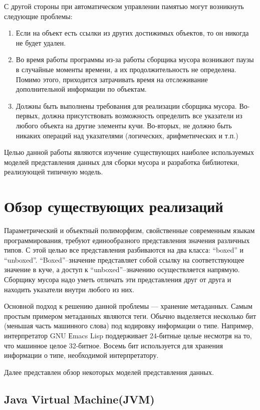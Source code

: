 С другой стороны при автоматическом управлении памятью могут возникнуть следующие проблемы:
\begin{enumerate}
\item Если на объект есть ссылки из других достижимых объектов, то он никогда не будет удален.
\item Во время работы программы из-за работы сборщика мусора возникают паузы в случайные моменты времени, а их продолжительность не определена.
Помимо этого, приходится затрачивать время на отслеживание дополнительной информации по объектам.
\item Должны быть выполнены  требования для реализации сборщика мусора.
Во-первых, должна присутствовать возможность определить все указатели из любого объекта на другие элементы кучи.
Во-вторых, не должно быть никаких операций над указателями (логических, арифметических и т.п.)
\end{enumerate}

Целью данной работы являются изучение существующих наиболее используемых моделей представления данных для сборки мусора и
разработка библиотеки, реализующей типичную модель.

\section{Обзор существующих реализаций}

Параметрический и объектный полиморфизм, свойственные современным языкам программирования, требуют единообразного представления  
значения различных типов. С этой целью все представления разбиваются на два класса: ``boxed'' и ``unboxed''. ``Boxed''--значение представляет 
собой ссылку на соответствующее значение в куче, а доступ к ``unboxed''--значению осуществляется напрямую. 
Сборщику мусора надо уметь отличать эти представления друг от друга и находить указатели внутри любого из них.

Основной подход к решению данной проблемы --- хранение метаданных. Самым простым примером метаданных являются теги.
Обычно выделяется несколько бит (меньшая часть машинного слова) под кодировку информации о типе. Например, интерпретатор GNU Еmacs Lisp 
поддерживает 24-битные целые несмотря на то, что машинное целое 32-битное. Восемь бит используется для хранения информации о типе,
необходимой интерпретатору.

Далее представлен обзор некоторых моделей представления данных.

\subsection {Java Virtual Machine(JVM)}

